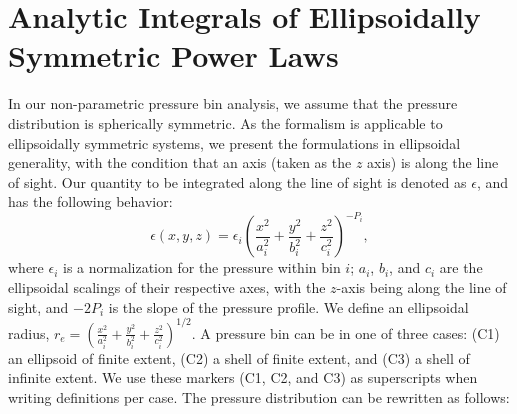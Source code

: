 \documentclass[twocolumn,traditabstract]{aa}
\begin{document}
\appendix

\section{Analytic Integrals of Ellipsoidally Symmetric Power Laws}
\label{sec:analytic_integrals}

In our non-parametric pressure bin analysis, we assume that the pressure distribution is spherically symmetric.
As the formalism is applicable to ellipsoidally symmetric systems, we present the formulations in ellipsoidal
generality, with the condition that an axis (taken as the $z$ axis) is along the line of sight.
Our quantity to be integrated along the line of sight is denoted as $\epsilon$, and has the
following behavior:
\begin{equation}
  \epsilon(x,y,z) = \epsilon_i (\frac{x^2}{a_i^2}+\frac{y^2}{b_i^2}+\frac{z^2}{c_i^2})^{-P_i},
\end{equation}
where $\epsilon_i$ is a normalization for the pressure within bin $i$;
$a_i$, $b_i$, and $c_i$ are the ellipsoidal scalings of their respective axes,
with the $z$-axis being along the line of sight, and $-2P_i$ is the slope of the pressure profile. We define an
ellipsoidal radius, $r_e = (\frac{x^2}{a_i^2}+\frac{y^2}{b_i^2}+\frac{z^2}{c_i^2})^{1/2}$.
A pressure bin can be in one of three cases: (C1) an ellipsoid of finite extent, (C2) a shell of
finite extent, and (C3) a shell of infinite extent. We use these markers (C1, C2, and C3) as superscripts
when writing definitions per case. The pressure distribution can be rewritten as follows:
\end{document}
